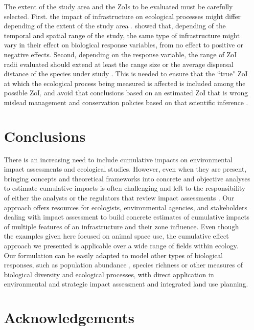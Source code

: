 \documentclass[titlepage]{article}
\begin{document}
The extent of the study area and the ZoIs to be evaluated must be carefully selected. First. the impact of infrastructure on ecological processes might differ depending of the extent of the study area \citep{vistnes_matter_2008}. \citet{skarin_human_2014} showed that, depending of the temporal and spatial range of the study, the same type of infrastructure might vary in their effect on biological response variables, from no effect to positive or negative effects. Second, depending on the response variable, the range of ZoI radii evaluated should extend at least the range size or the average dispersal distance of the species under study \citep{jackson_what_2012}. This is needed to ensure that the ``true" ZoI at which the ecological process being measured is affected is included among the possible ZoI, and avoid that conclusions based on an estimated ZoI that is wrong mislead management and conservation policies based on that scientific inference \citep[e.g.][]{jackson_are_2015}.

\section{Conclusions}

There is an increasing need to include cumulative impacts on environmental impact assessments and ecological studies. However, even when they are present, bringing concepts and theoretical frameworks into concrete and objective analyses to estimate cumulative impacts is often challenging and left to the responsibility of either the analysts or the regulators that review impact assessments \citep{johnson_regulating_2011}. Our approach offers resources for ecologists, environmental agencies, and stakeholders dealing with impact assessment to build concrete estimates of cumulative impacts of multiple features of an infrastructure and their zone influence. 
Even though the examples given here focused on animal space use, the cumulative effect approach we presented is applicable over a wide range
of fields within ecology. Our formulation can be easily adapted to model other types of biological responses, such as population abundance \citep[e.g.][]{benitez-lopez_impacts_2010}, species richness \citep[e.g.][]{ficetola_ecological_2009} or other measures of biological diversity and ecological processes, with direct application in environmental and strategic impact assessment and integrated land use planning.
      
\section*{Acknowledgements}
\end{document}
